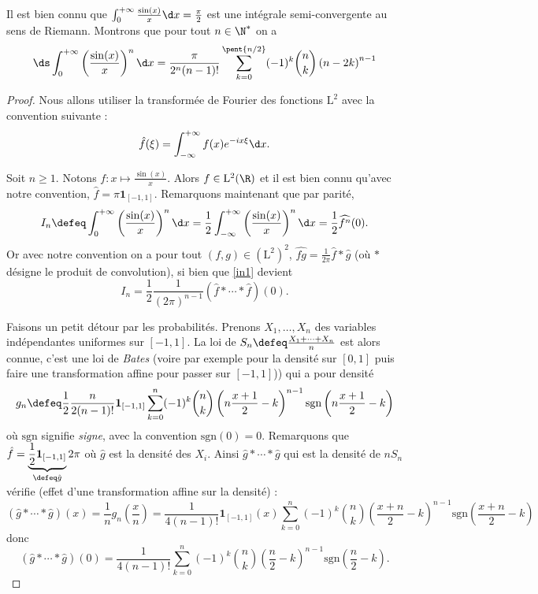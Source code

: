 \documentclass{notes}
\begin{document}

Il est bien connu que $\int_{0}^{+\infty} \frac{\sin(x)}{x} \d x = \frac{\pi}{2}$ est une intégrale semi-convergente au sens de Riemann. Montrons que pour tout $n\in\N^{*}$ on a 
\[ \ds\int_0^{+\infty} \left( \frac{\sin(x)}{x} \right)^{n}\d x = \frac{\pi}{2^{n}(n-1)!}  \sum_{k=0}^{\pent{n/2}} (-1)^{k}\binom nk \left( n - 2k \right)^{n-1}\] 

\begin{proof}
  Nous allons utiliser la transformée de Fourier des fonctions $\mathrm L^{2}$ avec la convention suivante : 
  \[ \hat f(\xi) = \int_{-\infty}^{+\infty} f(x) e^{-ix \xi} \d x. \]

  Soit $n\geq 1$. Notons $f\colon x \mapsto \frac{\sin(x)}{x}$. Alors $f\in\mathrm L^{2}(\R)$ et il est bien connu qu'avec notre convention, $\hat f = \pi \mathbf 1_{[-1,1]}$. Remarquons maintenant que par parité, 
  \begin{equation}
    \label{in1}
    I_n \defeq \int_{0}^{+\infty} \left( \frac{\sin(x)}{x} \right)^{n} \d x = \frac 12 \int_{-\infty}^{+\infty} \left( \frac{\sin(x)}{x} \right)^{n} \d x = \frac 12 \widehat{f^{n}}(0). 
  \end{equation}
  Or avec notre convention on a pour tout $(f,g)\in (\mathrm L^{2})^{2}$, $\widehat{fg}= \frac 1{2\pi} \hat f \ast \hat g$ (où $\ast$ désigne le produit de convolution), si bien que \eqref{in1} devient  
  \begin{equation}
    \label{in2}
    I_n = \frac 12 \frac{1}{(2\pi)^{n-1}} \left( \hat f\ast \cdots \ast \hat  f \right)(0).
  \end{equation}

  Faisons un petit détour par les probabilités. Prenons $X_1,\dots,X_n$ des variables indépendantes uniformes sur $[-1,1]$. La loi de $S_n \defeq \frac{X_1+\cdots+X_n}{n}$ est alors connue, c'est une loi de \emph{Bates} (voire par exemple \cite{JKB} pour la densité sur $[0,1]$ puis faire une transformation affine pour passer sur $[-1,1]$)) qui a pour densité 
  \[ g_{n} \defeq  \frac 12 \frac{n}{2(n-1)!}  \mathbf 1_{[-1,1]} \sum_{k=0}^{n} (-1)^{k} \binom nk \left( n\frac{x+1}{2}- k \right)^{n-1} \mathrm{sgn}\left( n\frac{x+1}{2}- k \right) \]
  où $\mathrm{sgn}$ signifie \emph{signe}, avec la convention $\text{sgn}(0)=0$. Remarquons que $\hat f = \underbrace{\frac 12 \mathbf 1_{[-1,1]}}_{\defeq \hat g} 2\pi$ où $\hat g$ est la densité des $X_i$. Ainsi $\hat g \ast \cdots \ast \hat g$ qui est la densité de $nS_n$ vérifie (effet d'une transformation affine sur la densité) : 
  \[ \left( \hat g \ast \cdots \ast \hat g \right)(x) = \frac 1n g_{n}\left( \frac xn \right) =  \frac 1{4(n-1)!} \mathbf 1_{[-1,1]}(x) \sum_{k=0}^{n} (-1)^{k} \binom nk \left( \frac{x+n}{2}-k \right)^{n-1} \mathrm{sgn} \left( \frac{x+n}{2}-k  \right) \] 
  donc \[ \left( \hat g\ast \cdots \ast \hat g \right)(0) = \frac 1{4(n-1)!} \sum_{k=0}^{n} (-1)^{k}\binom nk \left( \frac n2 - k \right)^{n-1}\mathrm{sgn} \left( \frac n2 - k \right). \]


\end{proof}
\end{document}
